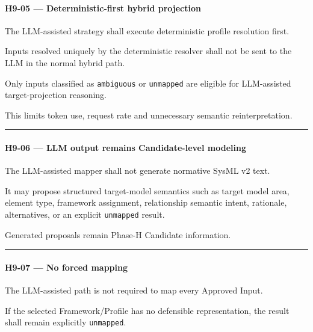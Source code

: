 \hypertarget{h9-05--deterministic-first-hybrid-projection}{%
\paragraph{H9-05 --- Deterministic-first hybrid projection}\label{h9-05--deterministic-first-hybrid-projection}}

The LLM-assisted strategy shall execute deterministic profile resolution first.

Inputs resolved uniquely by the deterministic resolver shall not be sent to the LLM in the normal hybrid path.

Only inputs classified as \texttt{ambiguous} or \texttt{unmapped} are eligible for LLM-assisted target-projection reasoning.

This limits token use, request rate and unnecessary semantic reinterpretation.

\begin{center}\rule{0.5\linewidth}{0.5pt}\end{center}

\hypertarget{h9-06--llm-output-remains-candidate-level-modeling}{%
\paragraph{H9-06 --- LLM output remains Candidate-level modeling}\label{h9-06--llm-output-remains-candidate-level-modeling}}

The LLM-assisted mapper shall not generate normative SysML v2 text.

It may propose structured target-model semantics such as target model area, element type, framework assignment, relationship semantic intent, rationale, alternatives, or an explicit \texttt{unmapped} result.

Generated proposals remain Phase-H Candidate information.

\begin{center}\rule{0.5\linewidth}{0.5pt}\end{center}

\hypertarget{h9-07--no-forced-mapping}{%
\paragraph{H9-07 --- No forced mapping}\label{h9-07--no-forced-mapping}}

The LLM-assisted path is not required to map every Approved Input.

If the selected Framework/Profile has no defensible representation, the result shall remain explicitly \texttt{unmapped}.

